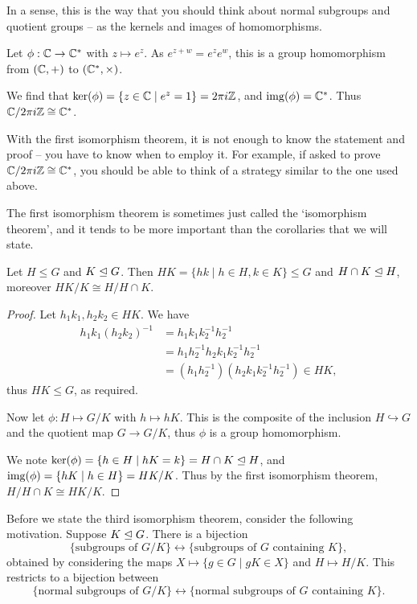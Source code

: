 \documentclass[a4paper]{scrartcl}
\begin{document}
In a sense, this is the way that you should think about normal subgroups and quotient groups -- as the kernels and images of homomorphisms.

\begin{example}
	Let $\phi : \mathbb{C} \rightarrow \mathbb{C}^{*}$ with $z \mapsto e^z$. As $e^{z + w} = e^z e^w$, this is a group homomorphism from $(\mathbb{C}, +)$ to $(\mathbb{C}^*, \times)$. 

	We find that $\operatorname{ker}(\phi) = \{ z \in \mathbb{C} \mid e^z = 1 \} = 2 \pi i \mathbb{Z}$, and $\operatorname{img}(\phi) = \mathbb{C}^*$. Thus $\mathbb{C}/2 \pi i \mathbb{Z} \cong \mathbb{C}^*$.
\end{example}

With the first isomorphism theorem, it is not enough to know the statement and proof -- you have to know when to employ it. For example, if asked to prove $\mathbb{C}/2 \pi i \mathbb{Z} \cong \mathbb{C}^*$, you should be able to think of a strategy similar to the one used above.

The first isomorphism theorem is sometimes just called the `isomorphism theorem', and it tends to be more important than the corollaries that we will state.

\begin{corollary}
	Let $H \leq G$ and $K \trianglelefteq G$. Then $HK = \{hk \mid h \in H, k \in K \} \leq G$ and $H \cap K \trianglelefteq H$, moreover $HK/K \cong H/H \cap K$.
\end{corollary}
\begin{proof}
	Let $h_1 k_1, h_2 k_2 \in HK$. We have
	\begin{align*}
		h_1 k_1 (h_2 k_2)^{-1} &= h_1 k_1 k_2^{-1} h_2^{-1} \\&= h_1 h_2^{-1} h_2 k_1 k_2^{-1} h_2^{-1} \\&= (h_1 h_2^{-1}) (h_2 k_1 k_2^{-1} h_2^{-1}) \in HK,
	\end{align*}
	thus $HK \leq G$, as required.

	Now let $\phi:H \mapsto G/K$ with $h \mapsto hK$. This is the composite of the inclusion $H \hookrightarrow G$ and the quotient map $G \rightarrow G/K$, thus $\phi$ is a group homomorphism.

	We note $\operatorname{ker}(\phi) = \{h \in H \mid hK = k\} = H \cap K \trianglelefteq H$, and $\operatorname{img}(\phi) =\{hK \mid h \in H \} = HK / K$. Thus by the first isomorphism theorem,
	$
	H/H \cap K \cong HK/K.
	$
\end{proof}

Before we state the third isomorphism theorem, consider the following motivation. Suppose $K \trianglelefteq G$. There is a bijection
$$
\{\text{subgroups of } G/K \} \longleftrightarrow \{ \text{subgroups of } G \text{ containing }K \},
$$
obtained by considering the maps $X \mapsto \{g \in G \mid gK \in X \}$ and $H \mapsto H/K$. This restricts to a bijection between
$$
\{\text{normal subgroups of }G/K \} \longleftrightarrow \{\text{normal subgroups of }G\text{ containing }K\}.
$$
\end{document}
